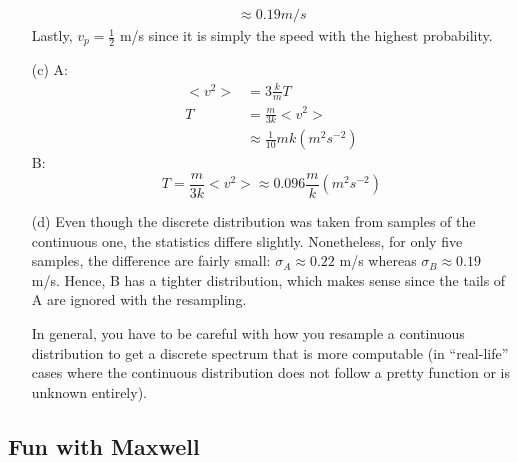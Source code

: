 \documentclass{article}
\begin{document}
\begin{itemize}
\begin{align*}
	\approx 0.19 m/s
	\end{align*}
	Lastly, $v_p = \frac{1}{2}$ m/s since it is simply the speed with the highest probability.
	\item[(c)] A:
	\begin{align*}
	<v^2> &= 3\frac{k}{m}T \\
	T &= \frac{m}{3k}<v^2> \\
	&\approx \frac{1}{10}{m}{k} (m^2 s^{-2})
	\end{align*}
	B:
	\begin{equation}
	T = \frac{m}{3k}<v^2> \approx 0.096\frac{m}{k} (m^2 s^{-2})
	\end{equation}
	\item[(d)] Even though the discrete distribution was taken from samples of the continuous one, the statistics differe slightly. Nonetheless, for only five samples, the difference are fairly small: $\sigma_A\approx0.22$ m/s whereas $\sigma_B\approx0.19$ m/s. Hence, B has a tighter distribution, which makes sense since the tails of A are ignored with the resampling.
	
	In general, you have to be careful with how you resample a continuous distribution to get a discrete spectrum that is more computable (in ``real-life'' cases where the continuous distribution does not follow a pretty function or is unknown entirely).
\end{itemize}

\subsection{Fun with Maxwell}
\end{document}
